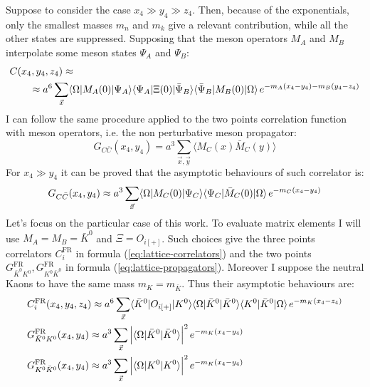 \documentclass[english, LaM, oneside, noexaminfo]{sapthesis}
\newcommand{\la}{\langle}
\newcommand{\ra}{\rangle}
\begin{document}
Suppose to consider the case $x_4 \gg y_4 \gg z_4$.
Then, because of the exponentials, only the smallest masses $m_n$ and $m_k$ give a relevant contribution, while all the other states are suppressed.
Supposing that the meson operators $M_A$ and $M_B$ interpolate some meson states $\Psi_A$ and $\Psi_B$:
\begin{equation}\label{eq:asymptotic-behav-3pts}
    \begin{split}
        & C(x_4,y_4,z_4)\approx \\
        & \qquad \approx  a^6\sum_{\vec x} \la \Omega | M_A(0) | \Psi_A \ra \la \Psi_A | \Xi (0) | \bar\Psi_B \ra \la \bar\Psi_B | M_B (0) | \Omega \ra \hspace*{.5mm} e^{-m_A(x_4-y_4)-m_B(y_4-z_4)}
    \end{split}
\end{equation}
I can follow the same procedure applied to the two points correlation function with meson operators, i.e. the non perturbative meson propagator:
\begin{equation}\label{eq:2pts-correlator-meson}
    G_{C\bar C}(x_4,y_4) = a^3 \sum_{\vec x, \vec y} \la M_C (x) \bar M_C (y) \ra
\end{equation}
For $x_4 \gg y_4$ it can be proved that the asymptotic behaviours of such correlator is:
\begin{equation}\label{eq:asymptotic-behav-2pts}
    G_{C\bar C}(x_4,y_4) \approx a^3 \sum_{\vec x} \la \Omega | M_C (0) | \Psi_C \ra \la \Psi_C | \bar M_C (0) | \Omega \ra \hspace*{0.5mm} e^{-m_C(x_4-y_4)}
\end{equation}
Let's focus on the particular case of this work.
To evaluate matrix elements I will use $M_A = M_B = \bar K^0$ and $\Xi = O_{i[+]}$.
Such choices give the three points correlators $C_i^\text{FR}$ in formula (\ref{eq:lattice-correlators}) and the two points $G_{\bar K^0 K^0}^\text{FR}, G_{K^0 \bar  K^0}^\text{FR}$ in formula (\ref{eq:lattice-propagators}).
Moreover I suppose the neutral Kaons to have the same mass $m_K = m_{\bar K}$.
Thus their asymptotic behaviours are:
\begin{equation*}
    \begin{split}
        & C_i^\text{FR}(x_4,y_4,z_4) \approx a^6\sum_{\vec x} \la \bar K^0 | O_{i[+]} | K^0 \ra  \la \Omega | \bar K^0 | \bar K^0 \ra  \la K^0 | \bar K^0 | \Omega \ra  \hspace*{.5mm} e^{-m_K(x_4-z_4)}  \\
        & G_{\bar K^0 K^0}^\text{FR}(x_4,y_4) \approx a^3\sum_{\vec x} \Big| \la \Omega | \bar K^0 | \bar K^0 \ra \Big|^2 \hspace*{.5mm} e^{-m_K(x_4-y_4)} \\
        & G_{K^0\bar K^0}^\text{FR}(x_4,y_4) \approx a^3\sum_{\vec x} \Big| \la \Omega |  K^0 |  K^0 \ra \Big|^2 \hspace*{.5mm} e^{-m_K(x_4-y_4)} \\
    \end{split}
\end{equation*}
\end{document}
